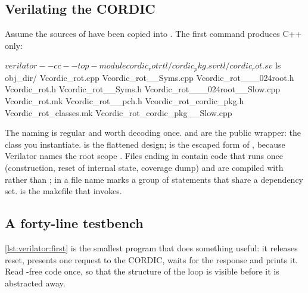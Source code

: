 \subsection{Verilating the CORDIC}

Assume the sources of  have been copied into . The
first command produces C++ only:

\begin{shcode}
$ verilator --cc --top-module cordic_rot rtl/cordic_pkg.sv rtl/cordic_rot.sv
$ ls obj_dir/
Vcordic_rot.cpp    Vcordic_rot__Syms.cpp   Vcordic_rot___024root.h
Vcordic_rot.h      Vcordic_rot__Syms.h     Vcordic_rot___024root__Slow.cpp
Vcordic_rot.mk     Vcordic_rot__pch.h      Vcordic_rot_cordic_pkg.h
Vcordic_rot_classes.mk                     Vcordic_rot_cordic_pkg__Slow.cpp
\end{shcode}

The naming is regular and worth decoding once.
 and  are the public wrapper: the class you
instantiate.  is the flattened design; 
is the escaped form of \code{\$}, because Verilator names the root scope
. Files ending in  contain code that runs once
(construction, reset of internal state, coverage dump) and are compiled with
 rather than ;  in a file name marks a group
of statements that share a dependency set.  is the makefile
that  invokes.

\subsection{A forty-line testbench}

\cref{lst:verilator:first} is the smallest program that does something useful:
it releases reset, presents one request to the CORDIC, waits for the response
and prints it. Read -free code once, so that the structure of the
loop is visible before it is abstracted away.

